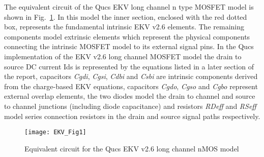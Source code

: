 The equivalent circuit of the Qucs EKV long channel n type MOSFET
model is shown in Fig.~\ref{fig:EKV1}.  In this model the inner
section, enclosed with the red dotted box, represents the fundamental
intrinsic EKV v2.6 elements. The remaining components model extrinsic
elements which represent the physical components connecting the
intrinsic MOSFET model to its external signal pins.  In the Qucs
implementation of the EKV v2.6 long channel MOSFET model the drain to
source DC current Ids is represented by the equations listed in a
later section of the report, capacitors \textit{Cgdi}, \textit{Cgsi},
\textit{Cdbi} and \textit{Csbi} are intrinsic components derived from
the charge-based EKV equations, capacitors \textit{Cgdo},
\textit{Cgso} and \textit{Cgbo} represent external overlap elements,
the two diodes model the drain to channel and source to channel
junctions (including diode capacitance) and resistors \textit{RDeff}
and \textit{RSeff} model series connection resistors in the drain and
source signal paths respectively.

\begin{figure}
  \centering
  \texttt{[image: EKV\_Fig1]}
  \caption{Equivalent circuit for the Qucs EKV v2.6 long channel nMOS model}
  \label{fig:EKV1}
\end{figure} 

